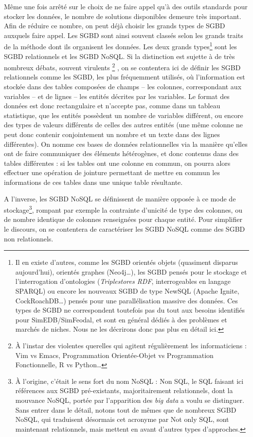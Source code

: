 			Même une fois arrêté sur le choix de ne faire appel qu'à des outils standards pour stocker les données, le nombre de solutions disponibles demeure très important.
			Afin de réduire ce nombre, on peut déjà choisir les grands types de SGBD auxquels faire appel.
			Les SGBD sont ainsi souvent classés selon les grands traits de la méthode dont ils organisent les données.
			Les deux grands types\footnote{
				Il en existe d'autres, comme les SGBD orientés objets (quasiment disparus aujourd'hui), orientés graphes (Neo4j\ldots), les SGBD pensés pour le stockage et l'interrogation d'ontologies (\textit{Triplestores RDF}, interrogeables en langage SPARQL) ou encore les nouveaux SGBD de type \og NewSQL \fg{} (Apache Ignite, CockRoachDB\ldots) pensés pour une parallélisation massive des données. Ces types de SGBD ne correspondent toutefois pas du tout aux besoins identifiés pour SimEDB/SimFeodal, et sont en général dédiés à des problèmes et marchés de niches. Nous ne les décrirons donc pas plus en détail ici.
			} sont les SGBD \og relationnels\fg{} et les SGBD \og NoSQL\fg{}.
			Si la distinction est sujette à de très nombreux débats, souvent virulents
			\footnote{
				À l'instar des violentes querelles qui agitent régulièrement les informaticiens : Vim vs Emacs, Programmation Orientée-Objet vs Programmation Fonctionnelle, R vs Python\ldots
			}
			, on se contentera ici de définir les SGBD relationnels comme les SGBD, les plus fréquemment utilisés, où l'information est stockée dans des tables composées de champs -- les colonnes, correspondant aux variables -- et de lignes -- les entités décrites par les variables.
			Le format des données est donc rectangulaire et n'accepte pas, comme dans un tableau statistique, que les entités possèdent un nombre de variables différent, ou encore des types de valeurs différents de celles des autres entités (une même colonne ne peut donc contenir conjointement un nombre et un texte dans des lignes différentes).
			On nomme ces bases de données relationnelles via la manière qu'elles ont de faire communiquer des éléments hétérogènes, et donc contenus dans des tables différentes : si les tables ont une colonne en commun, on pourra alors effectuer une opération de jointure permettant de mettre en commun les informations de ces tables dans une unique table résultante.

			A l'inverse, les SGBD NoSQL se définissent de manière opposée à ce mode de stockage\footnote{
				À l'origine, c'était le sens fort du nom \og NoSQL \fg{} : Non SQL, le SQL faisant ici références aux SGBD pré-existants, majoritairement relationnels, dont la mouvance NoSQL, portée par l'apparition des \og \textit{big data} \fg{} a voulu se distinguer.
				Sans entrer dans le détail, notons tout de mêmes que de nombreux SGBD NoSQL, qui traduisent désormais cet acronyme par \og Not only SQL\fg{}, sont maintenant relationnels, mais mettent en avant d'autres types d'approches.
			}, rompant par exemple la contrainte d'unicité de type des colonnes, ou de nombre identique de colonnes renseignées pour chaque entité. Pour simplifier le discours, on se contentera de caractériser les SGBD NoSQL comme des SGBD non relationnels.

